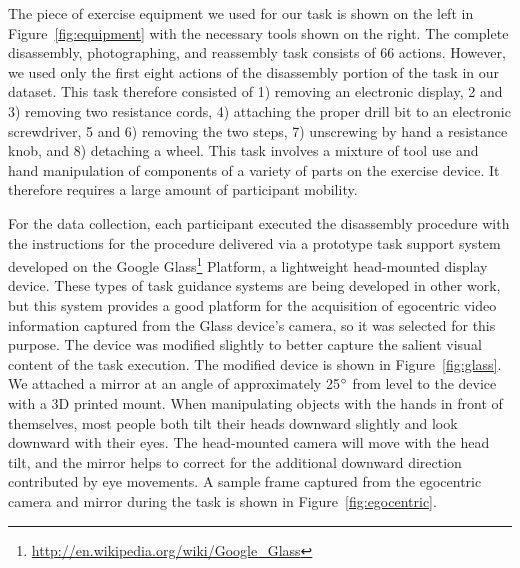 \documentclass[10pt,twocolumn,letterpaper]{article}
\begin{document}
The piece of exercise equipment we used for our task is shown on the left in Figure~\ref{fig:equipment} with the necessary tools shown on the right. The complete disassembly, photographing, and reassembly task consists of 66 actions. However, we used only the first eight actions of the disassembly portion of the task in our dataset. This task therefore consisted of 1) removing an electronic display, 2 and 3) removing two resistance cords, 4) attaching the proper drill bit to an electronic screwdriver, 5 and 6) removing the two steps, 7) unscrewing by hand a resistance knob, and 8) detaching a wheel. This task involves a mixture of tool use and hand manipulation of components of a variety of parts on the exercise device. It therefore requires a large amount of participant mobility.

For the data collection, each participant executed the disassembly procedure with the instructions for the procedure delivered via a prototype task support system developed on the Google Glass\footnote{\href{http://en.wikipedia.org/wiki/Google_Glass}{http://en.wikipedia.org/wiki/Google\_Glass}} Platform, a lightweight head-mounted display device. These types of task guidance systems are being developed in other work, but this system provides a good platform for the acquisition of egocentric video information captured from the Glass device's camera, so it was selected for this purpose. The device was modified slightly to better capture the salient visual content of the task execution. The modified device is shown in Figure~\ref{fig:glass}. We attached a mirror  at an angle of approximately 25$\degree$ from level to the device with a 3D printed mount. When manipulating objects with the hands in front of themselves, most people both tilt their heads downward slightly and look downward with their eyes. The head-mounted camera will move with the head tilt, and the mirror helps to correct for the additional downward direction contributed by eye movements. A sample frame captured from the egocentric camera and mirror during the task is shown in Figure~\ref{fig:egocentric}.
\end{document}
